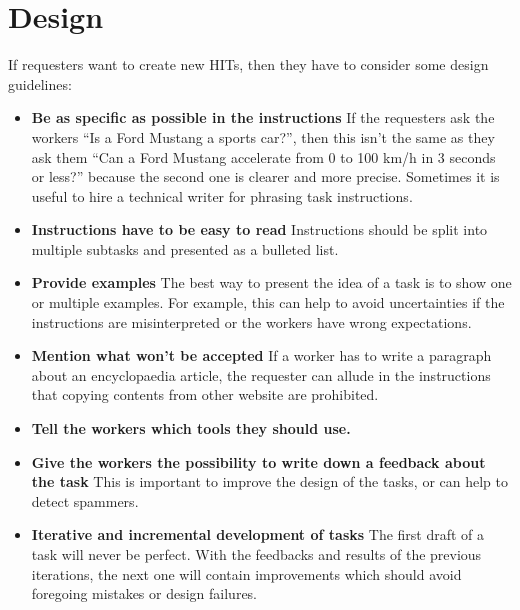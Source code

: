 \section{Design}
If requesters want to create new HITs, then they have to consider some design guidelines\cite{crowdsourcing_tutorial,mturk_bestpractices}: 
\begin{itemize}
\item \textbf{Be as specific as possible in the instructions} If the requesters ask the workers ``Is a Ford Mustang a sports car?'', then this isn't the same as they ask them ``Can a Ford Mustang accelerate from 0 to 100 km/h in 3 seconds or less?'' because the second one is clearer and more precise. Sometimes it is useful to hire a technical writer for phrasing task instructions. 
\item \textbf{Instructions have to be easy to read} Instructions should be split into multiple subtasks and presented as a bulleted list. 
\item \textbf{Provide examples} The best way to present the idea of a task is to show one or multiple examples. For example, this can help to avoid uncertainties if the instructions are misinterpreted or the workers have wrong expectations. 
\item \textbf{Mention what won't be accepted} If a worker has to write a paragraph about an encyclopaedia article, the requester can allude in the instructions that copying contents from other website are prohibited.
\item \textbf{Tell the workers which tools they should use.} 
\item \textbf{Give the workers the possibility to write down a feedback about the task} This is important to improve the design of the tasks, or can help to detect spammers. 
\item \textbf{Iterative and incremental development of tasks} The first draft of a task will never be perfect. With the feedbacks and results of the previous iterations, the next one will contain improvements which should avoid foregoing mistakes or design failures.
\end{itemize}


